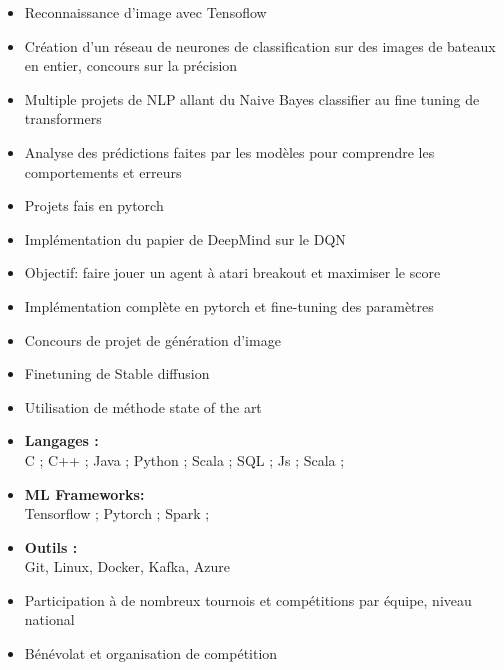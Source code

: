 \documentclass[10pt,a4paper,ragged2e,withhyper]{altacv}
\begin{document}
\begin{paracol}{2}
\begin{comment}
\divider
\end{comment}

\begin{itemize}
    \item Reconnaissance d'image avec Tensoflow
    \item Création d'un réseau de neurones de classification sur des images de bateaux en entier, concours sur la précision
\end{itemize}

\divider

\begin{itemize}
    \item Multiple projets de NLP allant du Naive Bayes classifier au fine tuning de transformers
    \item Analyse des prédictions faites par les modèles pour comprendre les comportements et erreurs
    \item Projets fais en pytorch
\end{itemize}

\divider
{}
\begin{itemize}
    \item Implémentation du papier de DeepMind sur le DQN
    \item Objectif: faire jouer un agent à atari breakout et maximiser le score
    \item Implémentation complète en pytorch et fine-tuning des paramètres
\end{itemize}
\divider
{}
\begin{itemize}
  \item Concours de projet de génération d'image
  \item Finetuning de Stable diffusion
  \item Utilisation de méthode state of the art
\end{itemize}

\begin{itemize}
    \item \textbf{Langages :} \\
            C ; C++ ; Java ; Python ; Scala ; SQL ; Js ; Scala ;
    \item \textbf{ML Frameworks:}\\
            Tensorflow ; Pytorch ; Spark ;
    \item \textbf{Outils :} \\
            Git, Linux, Docker, Kafka, Azure
\end{itemize}

\begin{itemize}
    \item Participation à de nombreux tournois et compétitions par équipe, niveau national
    \item Bénévolat et organisation de compétition

\end{itemize}

\end{paracol}
\end{document}
